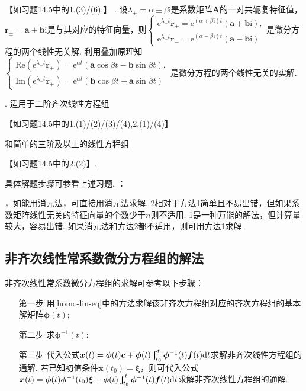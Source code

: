 \documentclass[12pt,UTF8]{ctexart}
\newcommand{\Int}[4]{\varint\nolimits_{#1}^{#2}#3\mathrm d#4}
\newcommand{\me}[0]{\mathrm e}
\newcommand{\m}[0]{\mathrm }
\begin{document}
\begin{enumerate}
\begin{enumerate}
【如习题14.5中的1.(3)/(6).】
. 设$\lambda_{\pm}=\alpha\pm\beta\m i$是系数矩阵$\bm A$的一对共轭复特征值，$\bm r_{\pm}=\bm a\pm\bm b\m i$是与其对应的特征向量，则$\begin{cases}
\me^{\lambda_+t}\bm r_+=\me^{(\alpha+\beta\m i)t}(\bm a+\bm b\m i),\\
\me^{\lambda_-t}\bm r_-=\me^{(\alpha-\beta\m i)t}(\bm a-\bm b\m i)
\end{cases}$是微分方程的两个线性无关解. 利用叠加原理知$\begin{cases}
\text{Re}(\me^{\lambda_+t}\bm r_+)=\me^{\alpha t}(\bm a\cos\beta t-\bm b\sin\beta t),\\
\text{Im}(\me^{\lambda_+t}\bm r_+)=\me^{\alpha t}(\bm b\cos\beta t+\bm a\sin\beta t)
\end{cases}$是微分方程的两个线性无关的实解.
\end{enumerate}
. 适用于二阶齐次线性方程组

【如习题14.5中的1.(1)/(2)/(3)/(4),2.(1)/(4)】

和简单的三阶及以上的线性方程组

【如习题14.5中的2.(2)】.

具体解题步骤可参看上述习题.
：
\begin{enumerate}
，如能用消元法，可直接用消元法求解. 
2相对于方法1简单且不易出错，但如果系数矩阵线性无关的特征向量的个数少于$n$则不适用.
1是一种万能的解法，但计算量较大，容易出错. 如果消元法和方法2都不适用，则可用方法1求解.
\end{enumerate}
\end{enumerate}
\subsection{非齐次线性常系数微分方程组的解法}
非齐次线性常系数微分方程组的求解可参考以下步骤：
\begin{enumerate}
\item[第一步]用\ref{homo-lin-eq}中的方法求解该非齐次方程组对应的齐次方程组的基本解矩阵$\bm\phi(t)$;
\item[第二步]求$\bm\phi^{-1}(t)$;
\item[第三步]代入公式$\bm x(t)=\bm\phi(t)\bm c+\bm\phi(t)\Int{t_0}t{\bm\phi^{-1}(t)\bm  f(t)}t$求解非齐次线性方程组的通解. 若已知初值条件$\bm x(t_0)=\bm\xi$，则可代入公式$\bm x(t)=\bm\phi(t)\bm\phi^{-1}(t_0)\bm\xi+\bm\phi(t)\Int{t_0}t{\bm\phi^{-1}(t)\bm  f(t)}t$求解非齐次线性方程组的通解.
\end{enumerate}
\end{document}
